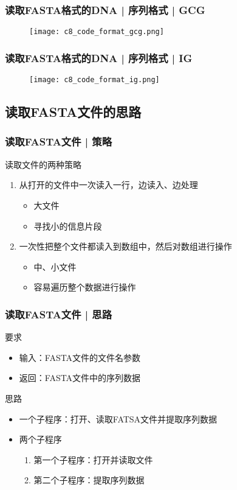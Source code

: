 \begin{frame}
  \frametitle{读取FASTA格式的DNA | 序列格式 | GCG}
  \begin{figure}
    \centering
    \texttt{[image: c8\_code\_format\_gcg.png]}
  \end{figure}
\end{frame}

\begin{frame}
  \frametitle{读取FASTA格式的DNA | 序列格式 | IG}
  \begin{figure}
    \centering
    \texttt{[image: c8\_code\_format\_ig.png]}
  \end{figure}
\end{frame}

\subsection{读取FASTA文件的思路}
\begin{frame}
  \frametitle{读取FASTA文件 | \alert{策略}}
  \begin{block}{读取文件的两种策略}
    \begin{enumerate}
      \item 从打开的文件中一次读入一行，边读入、边处理
	\begin{itemize}
	  \item 大文件
	  \item 寻找小的信息片段
	\end{itemize}
      \item 一次性把整个文件都读入到数组中，然后对数组进行操作
	\begin{itemize}
	  \item 中、小文件
	  \item 容易遍历整个数据进行操作
	\end{itemize}
    \end{enumerate}
  \end{block}
\end{frame}

\begin{frame}
  \frametitle{读取FASTA文件 | 思路}
  \begin{block}{要求}
    \begin{itemize}
      \item 输入：FASTA文件的文件名参数
      \item 返回：FASTA文件中的序列数据
    \end{itemize}
  \end{block}
  \pause
  \begin{block}{思路}
    \begin{itemize}
      \item 一个子程序：打开、读取FATSA文件并提取序列数据
      \item 两个子程序
	\begin{enumerate}
	  \item 第一个子程序：打开并读取文件
	  \item 第二个子程序：提取序列数据
	\end{enumerate}
    \end{itemize}
  \end{block}
\end{frame}

